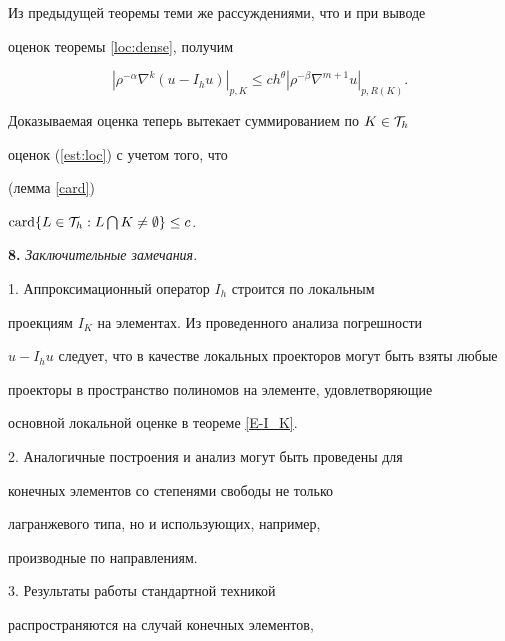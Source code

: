 \begin{pf}


Из предыдущей теоремы теми же рассуждениями, что и при выводе 


оценок теоремы \ref{loc:dense}, получим 


\begin{equation} \label{est:loc}


{|\rho^{-\alpha}\nabla^k(u-I_hu)|}_{p,K} \le c h^\theta 


{|\rho^{-\beta}\nabla^{m+1}u|}_{p,R(K)}.


\end{equation}


Доказываемая оценка теперь вытекает суммированием по $K \in {\cal T}_h$


оценок (\ref{est:loc}) с учетом того, что 


(лемма \ref{card})


$\operatorname{card} \{L \in {\cal T}_h: L \bigcap K \neq \emptyset \} \le c$. 


\end{pf}





{\bf 8.} {\it Заключительные замечания.} 





1. Аппроксимационный оператор $I_h$ строится по локальным 


проекциям $I_K$ на элементах. Из проведенного анализа погрешности 


$u-I_hu$ следует, что в качестве локальных проекторов могут быть взяты любые 


проекторы в пространство полиномов на элементе, удовлетворяющие 


основной локальной оценке в теореме \ref{E-I_K}. 





2. Аналогичные построения и анализ могут быть проведены для 


конечных элементов со степенями свободы не только 


лагранжевого типа, но и использующих, например, 


производные по направлениям. 





3. Результаты работы стандартной техникой 


распространяются на случай конечных элементов, 


